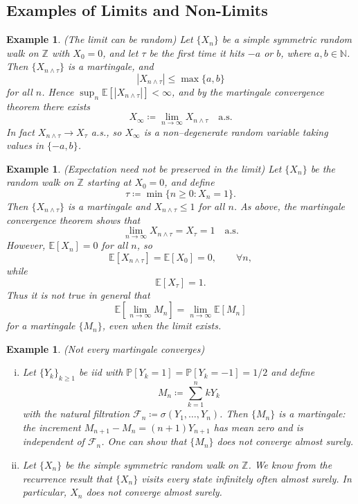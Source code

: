 \documentclass{tufte-handout}
\newcommand*\N{\mathbb{N}}
\newcommand*\Z{\mathbb{Z}}
\newcommand*\E{\mathbb{E}}
\renewcommand*\P{\mathbb{P}}
\newtheorem{ex}[thm]{Example}
\theoremstyle{definition}
\begin{document}
\subsection{Examples of Limits and Non-Limits}

\begin{ex}
	(The limit can be random) Let $\{X_n\}$ be a simple symmetric random walk on
	$\Z$ with $X_0 = 0$, and let $\tau$ be the first time it hits $-a$ or $b$,
	where $a,b \in \N$. Then $\{X_{n \wedge \tau}\}$ is a martingale, and
	\[
		\left| X_{n \wedge \tau} \right| \le \max\{a,b\}
	\]
	for all $n$. Hence $\sup_n \E\left[ |X_{n \wedge \tau}| \right] < \infty$, and
	by the martingale convergence theorem there exists
	\[
		X_\infty \coloneqq \lim_{n \to \infty} X_{n \wedge \tau} \quad \text{a.s.}
	\]
	In fact $X_{n \wedge \tau} \to X_\tau$ a.s., so $X_\infty$ is a non–degenerate
	random variable taking values in $\{-a,b\}$.
\end{ex}

\begin{ex}
	(Expectation need not be preserved in the limit) Let $\{X_n\}$ be the random
	walk on $\Z$ starting at $X_0 = 0$, and define
	\[
		\tau \coloneqq \min\{ n \ge 0 : X_n = 1 \}
	.\] 
	Then $\{X_{n \wedge \tau}\}$ is a martingale and $X_{n \wedge \tau} \le 1$ for
	all $n$. As above, the martingale convergence theorem shows that
	\[
		\lim_{n \to \infty} X_{n \wedge \tau} = X_\tau = 1 \quad \text{a.s.}
	\] 
	However, $\E\left[ X_n \right] = 0$ for all $n$, so
	\[
		\E\left[ X_{n \wedge \tau} \right] = \E\left[ X_0 \right] = 0, \qquad \forall n,
	\]
	while
	\[
		\E\left[ X_\tau \right] = 1
	.\] 
	Thus it is \emph{not} true in general that
	\[
		\E\left[ \lim_{n \to \infty} M_n \right] = \lim_{n \to \infty} \E\left[ M_n \right]
	\]
	for a martingale $\{M_n\}$, even when the limit exists.
\end{ex}

\begin{ex}
	(Not every martingale converges) 
	\begin{enumerate}[(i)]
		\item Let $\{Y_k\}_{k \ge 1}$ be iid with
		      $\P\left[ Y_k = 1 \right] = \P\left[ Y_k = -1 \right] = 1/2$ and define
		      \[
			      M_n \coloneqq \sum_{k=1}^{n} k Y_k
		      \]
		      with the natural filtration $\mathscr{F}_n \coloneqq \sigma(Y_1,\ldots,Y_n)$.
		      Then $\{M_n\}$ is a martingale: the increment $M_{n+1}-M_n =
			      (n+1)Y_{n+1}$ has mean zero and is independent of $\mathscr{F}_n$.
		      One can show that $\{M_n\}$ does not converge almost surely.
		\item Let $\{X_n\}$ be the simple symmetric random walk on $\Z$. We know from
		      the recurrence result that $\{X_n\}$ visits every state infinitely often
		      almost surely. In particular, $X_n$ does not converge almost surely.
	\end{enumerate}
\end{ex}
\end{document}
